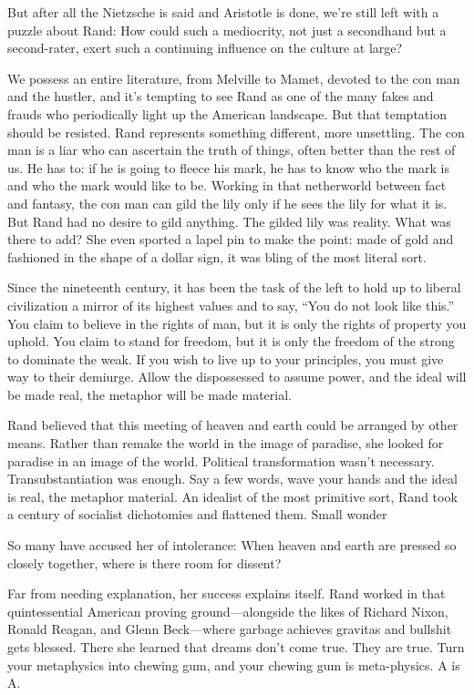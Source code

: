  \par 
But after all the Nietzsche is said and Aristotle is done, we’re still left with a puzzle about Rand: How could such a mediocrity, not just a secondhand but a second-rater, exert such a continuing influence on the culture at large?
 \par 
We possess an entire literature, from Melville to Mamet, devoted to the con man and the hustler, and it’s tempting to see Rand as one of the many fakes and frauds who periodically light up the American landscape. But that temptation should be resisted. Rand represents something different, more unsettling. The con man is a liar who can ascertain the truth of things, often better than the rest of us. He has to: if he is going to fleece his mark, he has to know who the mark is and who the mark would like to be. Working in that netherworld between fact and fantasy, the con man can gild the lily only if he sees the lily for what it is. But Rand had no desire to gild anything. The gilded lily was reality. What was there to add? She even sported a lapel pin to make the point: made of gold and fashioned in the shape of a dollar sign, it was bling of the most literal sort.
 \par 
Since the nineteenth century, it has been the task of the left to hold up to liberal civilization a mirror of its highest values and to say, “You do not look like this.” You claim to believe in the rights of man, but it is only the rights of property you uphold. You claim to stand for freedom, but it is only the freedom of the strong to dominate the weak. If you wish to live up to your principles, you must give way to their demiurge. Allow the dispossessed to assume power, and the ideal will be made real, the metaphor will be made material.
 \par 
Rand believed that this meeting of heaven and earth could be arranged by other means. Rather than remake the world in the image of paradise, she looked for paradise in an image of the world. Political transformation wasn’t necessary. Transubstantiation was enough. Say a few words, wave your hands and the ideal is real, the metaphor material. An idealist of the most primitive sort, Rand took a century of socialist dichotomies and flattened them. Small wonder
 \par 
So many have accused her of intolerance: When heaven and earth are pressed so closely together, where is there room for dissent?
 \par 
Far from needing explanation, her success explains itself. Rand worked in that quintessential American proving ground—alongside the likes of Richard Nixon, Ronald Reagan, and Glenn Beck—where garbage achieves gravitas and bullshit gets blessed. There she learned that dreams don’t come true. They are true. Turn your metaphysics into chewing gum, and your chewing gum is meta-physics. A is A.